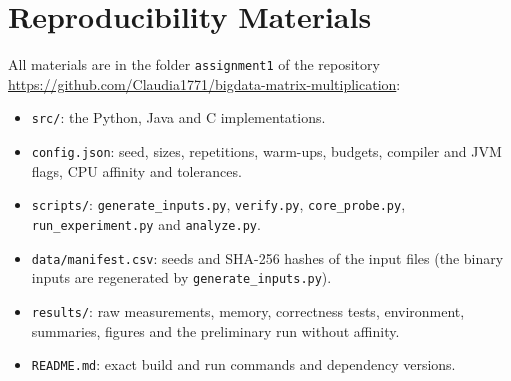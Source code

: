 \documentclass[12pt,a4paper]{report}
\begin{document}
\chapter*{Reproducibility Materials}

All materials are in the folder \texttt{assignment1} of the repository
\url{https://github.com/Claudia1771/bigdata-matrix-multiplication}:
\begin{itemize}
  \item \texttt{src/}: the Python, Java and C implementations.
  \item \texttt{config.json}: seed, sizes, repetitions, warm-ups, budgets, compiler and JVM flags, CPU affinity and
  tolerances.
  \item \texttt{scripts/}: \texttt{generate\_inputs.py}, \texttt{verify.py}, \texttt{core\_probe.py},
  \texttt{run\_experiment.py} and \texttt{analyze.py}.
  \item \texttt{data/manifest.csv}: seeds and SHA-256 hashes of the input files (the binary inputs are regenerated by
  \texttt{generate\_inputs.py}).
  \item \texttt{results/}: raw measurements, memory, correctness tests, environment, summaries, figures and the
  preliminary run without affinity.
  \item \texttt{README.md}: exact build and run commands and dependency versions.
\end{itemize}
\end{document}
